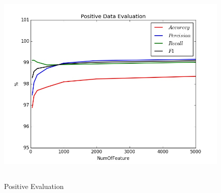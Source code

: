 \documentclass[a4paper,11pt,twoside,openany]{article}
\begin{document}
\begin{CJK*}{UTF8}{gbsn}
\begin{figure}
\centering %
\includegraphics[height=10cm ,width=15cm,angle=0,scale=1]{positive.jpg}
\caption{\label{Fig:outputfile}Positive Evaluation } %
\end{figure}

\end{CJK*}
\end{document}

